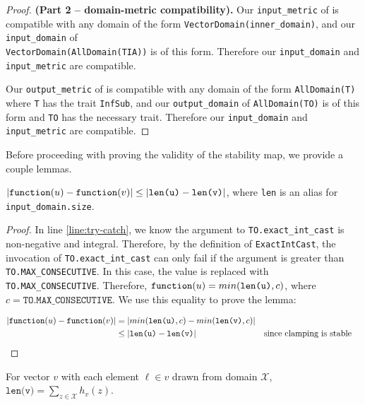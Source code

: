 \documentclass{article}
\begin{document}
\begin{proof} \textbf{(Part 2 -- domain-metric compatibility).}
    Our \texttt{input\_metric} of  is compatible with any domain of the form \texttt{VectorDomain(inner\_domain)}, 
    and our \texttt{input\_domain} of \\\texttt{VectorDomain(AllDomain(TIA))} is of this form. 
    Therefore our \texttt{input\_domain} and \texttt{input\_metric} are compatible.

    Our \texttt{output\_metric} of  is compatible with any domain of the form \texttt{AllDomain(T)} where \texttt{T} has the trait \texttt{InfSub}, 
    and our \texttt{output\_domain} of \texttt{AllDomain(TO)} is of this form and \texttt{TO} has the necessary trait.
    Therefore our \texttt{input\_domain} and \texttt{input\_metric} are compatible.
\end{proof}

Before proceeding with proving the validity of the stability map, we provide a couple lemmas.

\begin{lemma}
    \label{dsym-sens}
    $|\texttt{function}(u) - \texttt{function}(v)| \leq |\texttt{len(u)} - \texttt{len(v)}|$, 
    where \texttt{len} is an alias for \\ \texttt{input\_domain.size}.
\end{lemma}

\begin{proof}
    In line \ref{line:try-catch}, we know the argument to \texttt{TO.exact\_int\_cast} is non-negative and integral.
    Therefore, by the definition of \texttt{ExactIntCast}, the invocation of \texttt{TO.exact\_int\_cast} can only fail if the argument is greater than \texttt{TO.MAX\_CONSECUTIVE}.
    In this case, the value is replaced with \texttt{TO.MAX\_CONSECUTIVE}.
    Therefore, $\texttt{function}(u) = min(\texttt{len(u)}, c)$, where $c = \texttt{TO.MAX\_CONSECUTIVE}$.
    We use this equality to prove the lemma:

    \begin{align*}
        |\texttt{function}(u) - \texttt{function}(v)| &= |min(\texttt{len(u)}, c) - min(\texttt{len(v)}, c)| \\
        &\leq |\texttt{len(u)} - \texttt{len(v)}| &&\text{since clamping is stable} \\
    \end{align*}
\end{proof}

\begin{lemma}
    \label{lemma:len-sum-equiv}
    For vector $v$ with each element $\ell\in v$ drawn from domain $\mathcal{X}$, $\texttt{len(v)} = \sum_{z\in\mathcal{X}} h_v(z)$.
\end{lemma}
\end{document}
